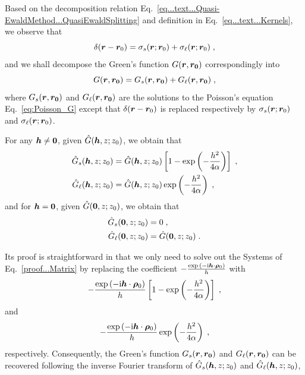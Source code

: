 Based on the decomposition relation Eq.~\eqref{eq...text...Quasi-EwaldMethod...QuasiEwaldSplitting} and definition in Eq.~\eqref{eq...text...Kernels}, we observe that 
\begin{equation}%
   \delta(\V{r}-\V{r}_0)=\sigma_s  (\V{r};\V{r}_0)+\sigma_\ell  (\V{r};\V{r}_0)\;,
\end{equation}
and we  shall decompose the Green's function  $ G(\boldsymbol{r}, \boldsymbol{r_0})$ correspondingly into
\begin{equation}
    G(\boldsymbol{r}, \boldsymbol{r_0})= G_s(\boldsymbol{r}, \boldsymbol{r_0})+  G_\ell(\boldsymbol{r}, \boldsymbol{r_0})\;,
\end{equation}
where $ G_s(\boldsymbol{r}, \boldsymbol{r_0})$ and $  G_\ell(\boldsymbol{r}, \boldsymbol{r_0})$ are the solutions to the Poisson's equation Eq.~\eqref{eq:Poisson_G} except that $\delta(\boldsymbol{r}-\boldsymbol{r}_0)$ is replaced respectively by $\sigma_s  (\boldsymbol{r};\boldsymbol{r}_0)$ and $\sigma_\ell  (\boldsymbol{r};\boldsymbol{r}_0)$.
\begin{corollary}
For any $\boldsymbol{h}\neq \bm{0}$, given     $\hat{G}(\boldsymbol{h}, z; z_0)$, we obtain that  
    \begin{align*}
        \hat{G}_s(\boldsymbol{h}, z; z_0)&=\hat{G}(\boldsymbol{h}, z; z_0)\left[1-\exp\left(-\frac{h^2}{4\alpha}\right)\right]\;,\\
        \hat{G}_\ell(\boldsymbol{h}, z; z_0)&=\hat{G}(\boldsymbol{h}, z; z_0)\exp\left(-\frac{h^2}{4\alpha}\right)\;,
    \end{align*} 
    and for  $\boldsymbol{h}=\bm{0}$, given     $\hat{G}(\bm{0}, z; z_0)$, we obtain that  
        \begin{align*}
        \hat{G}_s(\bm{0}, z; z_0)&=0\;,\\
        \hat{G}_\ell(\bm{0}, z; z_0)&=\hat{G}(\bm{0}, z; z_0)\;.
    \end{align*} 
\end{corollary}
Its proof is straightforward in that we only need to solve out the Systems of Eq.~\eqref{proof...Matrix} by replacing  the coefficient $-\frac{\exp{(-\mathrm{i} \boldsymbol{h} \cdot \boldsymbol{\rho}_0)}}{h }$ with  
\begin{equation*}
    -\frac{\exp{(-\mathrm{i} \boldsymbol{h} \cdot \boldsymbol{\rho}_0)}}{h }\left[1-\exp\left(-\frac{h^2}{4\alpha}\right)\right]\;,
\end{equation*}
and 
\begin{equation*}
    -\frac{\exp{(-\mathrm{i} \boldsymbol{h} \cdot \boldsymbol{\rho}_0)}}{h }\exp\left(-\frac{h^2}{4\alpha}\right)\;,
\end{equation*} 
respectively.
Consequently, the Green's function $ G_s(\boldsymbol{r}, \boldsymbol{r_0})$ and $  G_\ell(\boldsymbol{r}, \boldsymbol{r_0})$ can be recovered following the inverse Fourier transform of $  \hat{G}_s(\boldsymbol{h}, z; z_0)$ and $  \hat{G}_\ell(\boldsymbol{h}, z; z_0)$,
